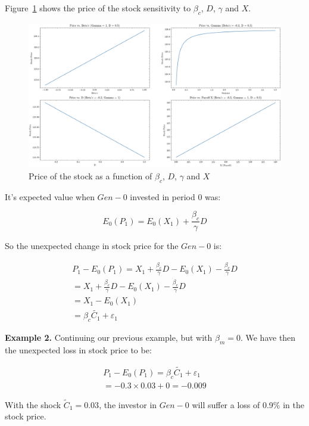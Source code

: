 Figure~\ref{fig:price} shows the price of the stock 
sensitivity to $\beta_{c}$, $D$, $\gamma$ and $X$.

\begin{figure}
    \includegraphics[width=\textwidth]{../images/chapter02/price_vs_parameters.png}
    \caption{Price of the stock as a function of $\beta_{c}$, $D$, $\gamma$ and 
    $X$}
    \label{fig:price}
\end{figure}

It's expected value when $Gen-0$ invested in period 0 was:

\begin{equation}
    E_0(P_1) = E_0(X_1) + \frac{\beta_{c}}{\gamma}D
\end{equation}

So the unexpected change in stock price 
for the $Gen-0$ is:

\begin{equation}
    \begin{aligned}
    P_1 - E_0(P_1) = X_1 + \frac{\beta_{c}}{\gamma}D - E_0(X_1) - \frac{\beta_{c}}{\gamma}D \\
    = X_1 + \frac{\beta_{c}}{\gamma}D - E_0(X_1) - \frac{\beta_{c}}{\gamma}D \\
    = X_1 - E_0(X_1) \\
    = \beta_{c} \tilde{C_1} + \varepsilon_1
    \end{aligned}
\end{equation}

\begin{example}[]
    \textbf{Example 2.} 
    Continuing our previous example, but with 
    $\beta_m = 0$. We have then 
    the unexpected loss in stock price to be: 

    \begin{equation}
        \begin{aligned}
        P_1 - E_0(P_1) = \beta_{c} \tilde{C_1} + \varepsilon_1 \\
        = -0.3 \times 0.03 + 0 = -0.009
        \end{aligned}
    \end{equation}

    With the shock $\tilde{C}_1 = 0.03$, the
    investor in $Gen-0$ will 
    suffer a loss of 0.9\% in the stock price.
    
\end{example}


